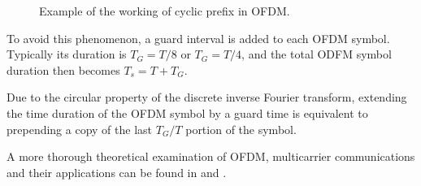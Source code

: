 \begin{figure}[H]
	\centering
	
	\vspace{0.5cm}
	
	\caption[]{Example of the working of cyclic prefix in OFDM.}
	\label{fig:OFDM_cyclic prefix}
\end{figure}

To avoid this phenomenon, a guard interval is added to each OFDM symbol. Typically its duration is $T_G = T/8$ or $T_G = T/4$, and the total ODFM symbol duration then becomes $T_s = T + T_G$.

Due to the circular property of the discrete inverse Fourier transform, extending the time duration of the OFDM symbol by a guard time is equivalent to prepending a copy of the last $T_G/T$ portion of the symbol.


A more thorough theoretical examination of OFDM, multicarrier communications and their applications can be found in \cite{OFDMWireless} and \cite{Proakis_2001}.


